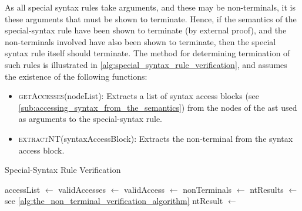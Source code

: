 As all special syntax rules take arguments, and these may be non-terminals, it is these arguments that must be shown to terminate. 
Hence, if the semantics of the special-syntax rule have been shown to terminate (by external proof), and the non-terminals involved have also been shown to terminate, then the special syntax rule itself should terminate.
The method for determining termination of such rules is illustrated in \autoref{alg:special_syntax_rule_verification}, and assumes the existence of the following functions:
\begin{itemize}
    \item \textsc{getAccesses}(nodeList): Extracts a list of syntax access blocks (see \autoref{sub:accessing_syntax_from_the_semantics}) from the nodes of the \gls{ast} used as arguments to the special-syntax rule.
    \item \textsc{extractNT}(syntaxAccessBlock): Extracts the non-terminal from the syntax access block.
\end{itemize}

\begin{breakablealgorithm}
\caption{Special-Syntax Rule Verification}
\label{alg:special_syntax_rule_verification}
\begin{algorithmic}
    \State accessList $\gets$ 
    \State validAccesses $\gets$ 
    \State validAccess $\gets$ 
    \State nonTerminals $\gets$ 
    \State ntResults $\gets$ 
    \Comment see \autoref{alg:the_non_terminal_verification_algorithm}
    \State ntResult $\gets$ 
    \State
        \State {}
    \Else
        \State {}
    \EndIf
\EndFunction
\end{algorithmic}
\end{breakablealgorithm}


